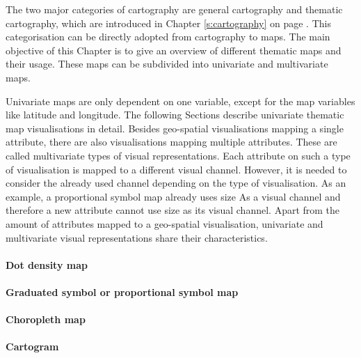 The two major categories of cartography are general cartography and thematic cartography, which are introduced in Chapter \ref{s:cartography} on page \pageref{s:cartography}. This categorisation can be directly adopted from cartography to maps. The main objective of this Chapter is to give an overview of different thematic maps and their usage. These maps can be subdivided into univariate and multivariate maps.

\cbstart
Univariate maps are only dependent on one variable, except for the map variables like latitude and longitude. The following Sections describe univariate thematic map visualisations in detail. Besides geo-spatial visualisations mapping a single attribute, there are also visualisations mapping multiple attributes. These are called multivariate types of visual representations. Each attribute on such a type of visualisation is mapped to a different visual channel. However, it is needed to consider the already used channel depending on the type of visualisation. As an example, a proportional symbol map already uses size As a visual channel and therefore a new attribute cannot use size as its visual channel.
Apart from the amount of attributes mapped to a geo-spatial visualisation, univariate and multivariate visual representations share their characteristics.
\cbend

\paragraph{Dot density map}
\label{s:dot}


\paragraph{Graduated symbol or proportional symbol map}


\paragraph{Choropleth map}

\label{s:choropleth}

\paragraph{Cartogram}

